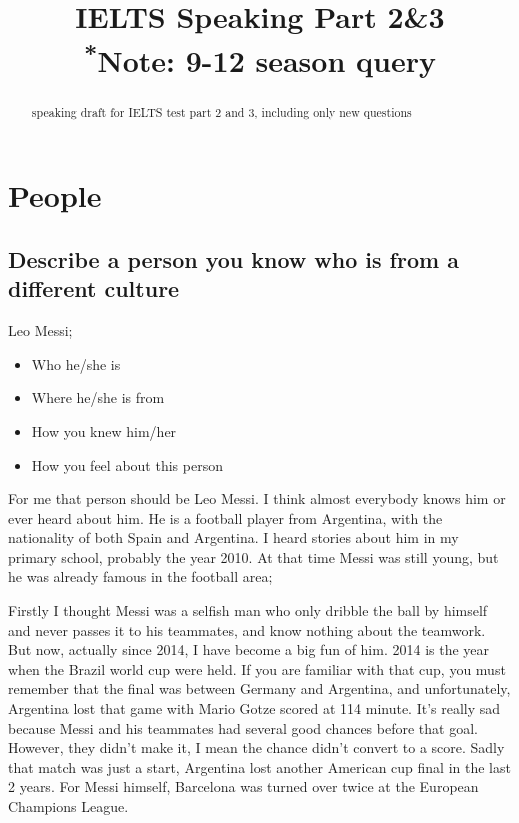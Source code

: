 \documentclass[conference]{IEEEtran}
\begin{document}
\title{IELTS Speaking Part 2\&3\\
{\footnotesize \textsuperscript{*}Note: 9-12 season query}}

\author{}

\maketitle

\begin{abstract}
speaking draft for IELTS test part 2 and 3, including only new questions
\end{abstract}

\section{People}
\subsection{Describe a person you know who is from a different culture}
Leo Messi;
    \begin{itemize}
        \item Who he/she is
        \item Where he/she is from
        \item How you knew him/her
        \item How you feel about this person
    \end{itemize}

For me that person should be Leo Messi. I think almost everybody knows him or ever heard about him.
He is a football player from Argentina, with the nationality of both Spain and Argentina.
I heard stories about him in my primary school, probably the year 2010.
At that time Messi was still young, but he was already famous in the football area;

Firstly I thought Messi was a selfish man who only dribble the ball by himself and never passes it to his teammates,
and know nothing about the teamwork. But now, actually since 2014, I have become a big fun of him.
2014 is the year when the Brazil world cup were held.
If you are familiar with that cup, you must remember that the final was between Germany and Argentina,
and unfortunately, Argentina lost that game with Mario Gotze scored at 114 minute.
It's really sad because Messi and his teammates had several good chances before that goal.
However, they didn't make it, I mean the chance didn't convert to a score.
Sadly that match was just a start, Argentina lost another American cup final in the last 2 years.
For Messi himself, Barcelona was turned over twice at the European Champions League.
\end{document}
